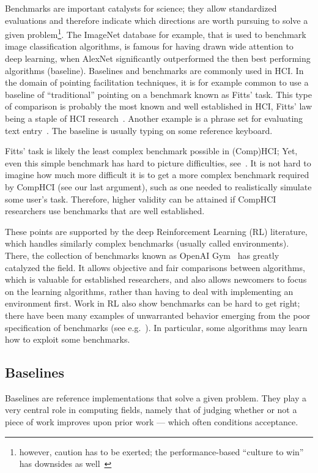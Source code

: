 \documentclass[12pt,a4paper]{article}
\begin{document}
Benchmarks are important catalysts for science; they allow standardized evaluations and therefore indicate which directions are worth pursuing to solve a given problem\footnote{however, caution has to be exerted; the performance-based ``culture to win'' has downsides as well~\cite{lin2019}}. The ImageNet database for example, that is used to benchmark image classification algorithms, is famous for having drawn wide attention to deep learning, when AlexNet significantly outperformed the then best performing algorithms (baseline). 
Baselines and benchmarks are commonly used in HCI. In the domain of pointing facilitation techniques, it is for example common to use a baseline of ``traditional'' pointing on a benchmark known as Fitts' task. This type of comparison is probably the most known and well established in HCI, Fitts' law being a staple of HCI research~\cite{gori2018tochi, soukoreff2004}. Another example is a phrase set for evaluating text entry~\cite{mackenzie2003}. The baseline is usually typing on some reference keyboard.

Fitts' task is likely the least complex benchmark possible in (Comp)HCI; Yet, even this simple benchmark has hard to picture difficulties, see~\cite{guiard2009, gori2018chi}. 
It is not hard to imagine how much more difficult it is to get a more complex benchmark required by CompHCI (see our last argument), such as one needed to realistically simulate some user's task. Therefore, higher validity can be attained if CompHCI researchers use benchmarks that are well established. 


These points are supported by the deep Reinforcement Learning (RL) literature, which handles similarly complex benchmarks (usually called environments). There, the collection of benchmarks known as OpenAI Gym~\cite{brockman2016} has greatly catalyzed the field. It allows objective and fair comparisons between algorithms, which is valuable for established researchers, and also allows newcomers to focus on the learning algorithms, rather than having to deal with implementing an environment first. 
Work in RL also show benchmarks can be hard to get right; there have been many examples of unwarranted behavior emerging from the poor specification of benchmarks (see e.g.~\cite{terry2020, openaicoastrunner}). In particular, some algorithms may learn how to exploit some benchmarks. 


\subsection{Baselines}
Baselines are reference implementations that solve a given problem. They play a very central role in computing fields, namely that of judging whether or not a piece of work improves upon prior work --- which often conditions acceptance. 
\end{document}
